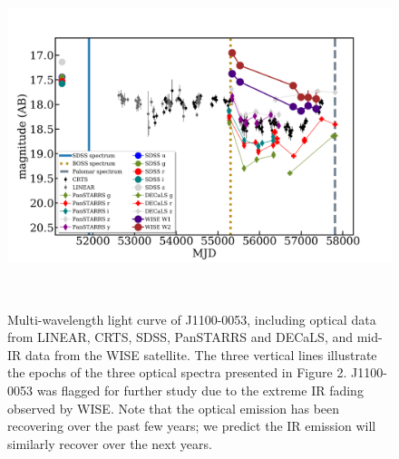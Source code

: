 \documentclass{nature}
\begin{document}
\begin{figure}
  \centering
  \includegraphics[width=16.00cm, height=10.00cm, trim=0.0cm 0.0cm 0.0cm 0.0cm, clip]
  {../plots/lc/J110057_lc_20171204v1.png}
  \caption[]{
    Multi-wavelength light curve of J1100-0053, including optical data from LINEAR, CRTS, SDSS, PanSTARRS and DECaLS, and mid-IR data from the WISE satellite.  The three vertical lines illustrate the epochs of the three optical spectra presented in Figure 2.  J1100-0053 was flagged for further study due to the extreme IR fading observed by WISE.  Note that the optical emission has been recovering over the past few years; we predict the IR emission will similarly recover over the next years.}
  \label{fig:J110057_LC_CRTS}
\end{figure}
\end{document}

